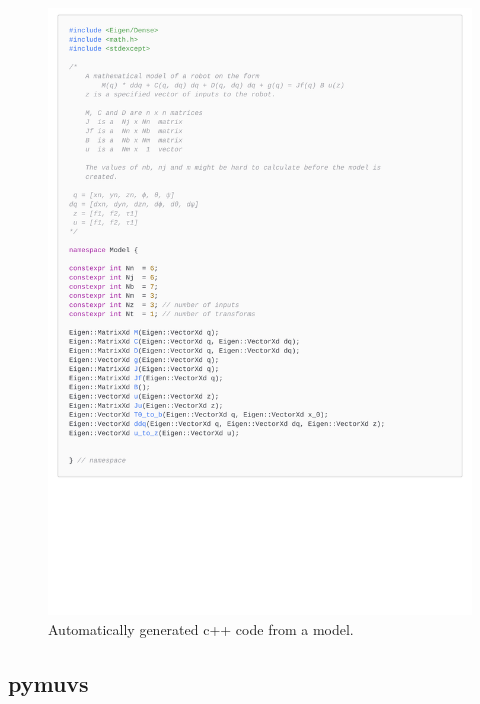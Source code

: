 \begin{figure}[h]
    \centering
    \includegraphics[page=1,width=\linewidth,trim=0 9cm 0 0]{assets/codegen.pdf}
    \caption{Automatically generated c++ code from a model.}
    \label{fig:codegen}
\end{figure}

\subsection{pymuvs}

